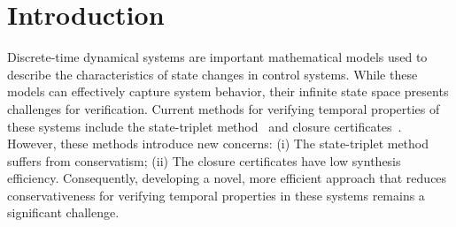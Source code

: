 \documentclass[acmlarge]{acmart}
\begin{document}



\maketitle

\section{Introduction}

Discrete-time dynamical systems are important mathematical models used to describe the characteristics of state changes in control systems. While these models can effectively capture system behavior, their infinite state space presents challenges for verification. Current methods for verifying temporal properties of these systems include the state-triplet method~\cite{wongpiromsarn2015automata} and closure certificates~\cite{murali2024closure}. However, these methods introduce new concerns: (i) The state-triplet method suffers from conservatism; (ii) The closure certificates have low synthesis efficiency. Consequently, developing a novel, more efficient approach that reduces conservativeness for verifying temporal properties in these systems remains a significant challenge.
\end{document}
